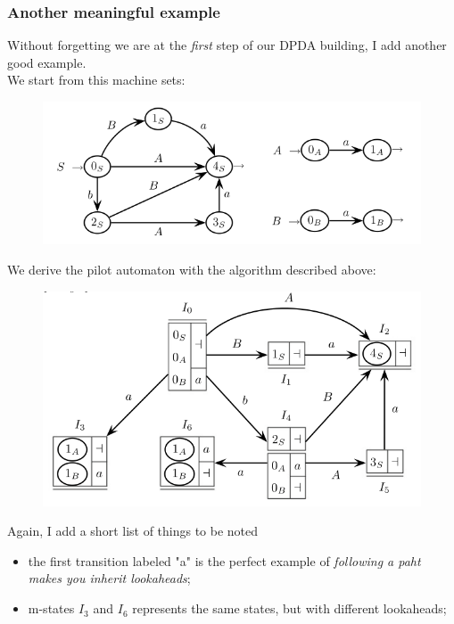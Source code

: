\documentclass[10pt,a4paper]{article}
\begin{document}
				\subsubsection{Another meaningful example}
					Without forgetting we are at the \emph{first} step of our DPDA building, I add another good example.\\
					We start from this machine sets:
					\begin{figure}[H]
						\begin{center}
							\includegraphics[width = \textwidth]{./images/ex2.png}
						\end{center}
					\end{figure}
					We derive the pilot automaton with the algorithm described above:
					\begin{figure}[H]
						\begin{center}
							\includegraphics[width = \textwidth]{./images/ex2Pilot.png}
						\end{center}
					\end{figure}
					Again, I add a short list of things to be noted
					\begin{itemize}
						\item the first transition labeled "a" is the perfect example of \emph{following a paht makes you inherit lookaheads};
						\item m-states $I_3$ and $I_6$ represents the same states, but with different lookaheads;
					\end{itemize}
					
\end{document}
